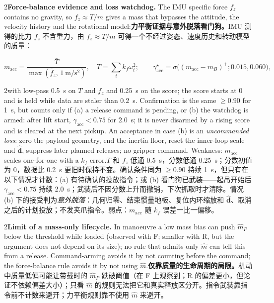 \documentclass[10pt,a4paper]{article}
\numberwithin{equation}{section}
\newcommand{\mB}{m_B}
\newcommand{\pair}[2]{\begin{paracol}{2}#1\switchcolumn #2\end{paracol}}
\begin{document}
\pair{\textbf{Force-balance evidence and loss watchdog.} The IMU specific force
$f_z$ contains no gravity, so $f_z\approx T/m$ gives a mass that bypasses the
attitude, the velocity history and the rotational model:}
{\textbf{力平衡证据与意外脱落看门狗。}IMU 测得的比力 $f_z$ 不含重力，由 $f_z\approx T/m$ 可得一个不经过姿态、速度历史和转动模型的质量：}
\begin{equation}
m_{\mathrm{acc}}=\frac{\bar T}{\max(\bar f_z,\,\SI{1}{\meter\per\second\squared})},\quad
T=\textstyle\sum_ik_f\omega_i^2;\qquad
\gamma^\star_{\mathrm{acc}}=\sigma\bigl((m_{\mathrm{acc}}-\mB)^+;0.015,0.060\bigr),
\label{eq:macc}
\end{equation}
\pair{with low-pass \SI{0.5}{\second} on $T$ and $f_z$ and \SI{0.25}{\second}
on the score; the score starts at 0 and is held while data are staler than
\SI{0.2}{\second}. Confirmation is the same $\ge0.90$ for \SI{1}{\second}, but
counts only if (a) a release command is pending, or (b) the watchdog is armed:
after lift start, $\gamma_{\mathrm{acc}}<0.75$ for \SI{2.0}{\second}; it is
never disarmed by a rising score and is cleared at the next pickup. An
acceptance in case (b) is an \emph{uncommanded loss}: zero the payload
geometry, end the inertia floor, reset the inner-loop scale and $\hat{\bm d}$,
suppress later planned releases; no gripper command. Weakness: $m_{\mathrm{acc}}$
scales one-for-one with a $k_f$ error.}
{$T$ 和 $f_z$ 低通 \SI{0.5}{\second}，分数低通 \SI{0.25}{\second}；分数初值为 0，数据比 \SI{0.2}{\second} 更旧时保持不变。确认条件同为 $\ge0.90$ 持续 \SI{1}{\second}，但只有在以下情况才计数：(a) 有待确认的投放指令；或 (b) 看门狗已武装——起吊开始后 $\gamma_{\mathrm{acc}}<0.75$ 持续 \SI{2.0}{\second}；武装后不因分数上升而撤销，下次抓取时才清除。情况 (b) 下的接受判为\emph{意外脱落}：几何归零、结束惯量地板、复位内环缩放和 $\hat{\bm d}$、取消之后的计划投放；不发夹爪指令。弱点：$m_{\mathrm{acc}}$ 随 $k_f$ 误差一比一偏移。}

\pair{\textbf{Limit of a mass-only lifecycle.} In manoeuvre a low mass bias can
push $\hat m_P$ below the threshold while loaded (observed with F; smaller with
R, but the argument does not depend on its size); no rule that admits only
$\hat m$ can tell this from a release. Command-arming avoids it by not
counting before the command; the force-balance rule avoids it by not using
$\hat m$.}
{\textbf{仅靠质量的生命周期的局限。}机动中质量低偏可能让带载时的 $\hat m_P$ 跌破阈值（在 F 上观察到；R 的偏差更小，但论证不依赖偏差大小）；只看 $\hat m$ 的规则无法把它和真实释放区分开。指令武装靠指令前不计数来避开；力平衡规则靠不使用 $\hat m$ 来避开。}
\end{document}
